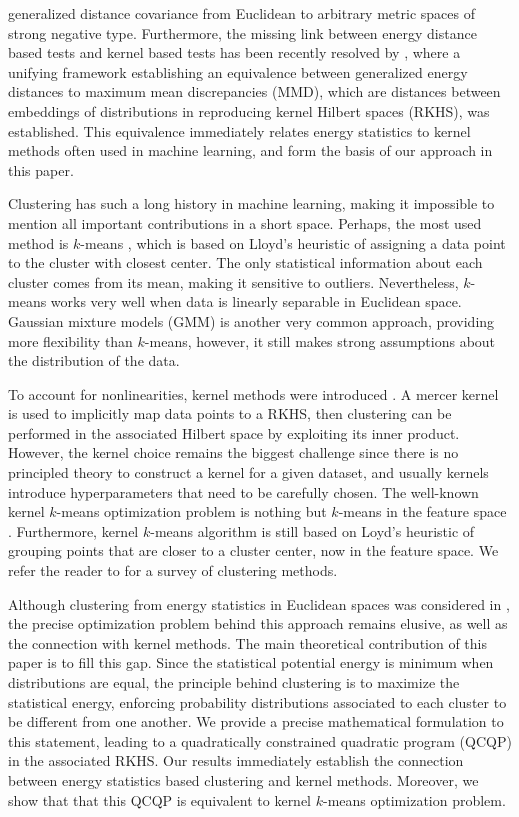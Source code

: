 \documentclass{article}
\begin{document}
\citet{Lyons} generalized
distance covariance from Euclidean 
to arbitrary metric spaces of strong negative type. Furthermore, 
the missing link between energy distance based tests and kernel 
based tests has 
been recently resolved by \citet{Sejdinovic2013}, where a unifying framework
establishing an equivalence between generalized energy distances to maximum
mean discrepancies (MMD), which are distances between embeddings of 
distributions in reproducing kernel Hilbert spaces (RKHS), was established. 
This equivalence immediately relates energy statistics to
kernel methods often used in machine learning, and form the basis 
of our approach in this paper.

Clustering has such a long history in machine learning, making it
impossible to mention all important contributions in a short space. 
Perhaps, the most used method is $k$-means \citep{Lloyd,MacQueen,Forgy}, which
is based on Lloyd's heuristic \citep{Lloyd} of assigning a data point to
the cluster with closest center. The only statistical 
information about each cluster comes from its mean, making it sensitive 
to outliers. Nevertheless, $k$-means works very well when data is 
linearly separable in Euclidean space. Gaussian mixture models (GMM) is 
another very common approach, providing more flexibility than $k$-means, 
however, it still makes strong assumptions about the distribution of 
the data.

To account for nonlinearities, kernel methods were introduced 
\citep{Smola,Girolami}. A mercer kernel \citep{Mercer} is used to implicitly
map data points to a RKHS, then clustering can be performed in the associated
Hilbert space by exploiting its inner product. However, 
the kernel choice remains 
the biggest challenge since there is no principled theory to construct a kernel
for a given dataset, and usually kernels introduce hyperparameters that 
need to be carefully chosen.
The well-known kernel $k$-means optimization problem is nothing but $k$-means 
in the feature space \citep{Girolami}. Furthermore, kernel $k$-means algorithm
\citep{Dhillon2,Dhillon} is still based on Loyd's heuristic 
of grouping points that are closer to a cluster center, now
in the feature space. 
We refer the reader to \citet{Filippone} for a survey of clustering
methods.

Although clustering from energy statistics in Euclidean spaces was considered
in \citet{Kgroups}, the precise optimization problem behind this approach
remains elusive, as well as the connection with kernel methods.
The main theoretical contribution of this paper is to fill this gap.
Since the statistical potential energy is minimum when
distributions are equal, the principle behind clustering is to maximize 
the statistical energy,  enforcing probability distributions associated to 
each cluster to be different from one another. We provide a precise 
mathematical formulation to this statement, leading to a quadratically 
constrained quadratic program (QCQP) in the associated RKHS. Our results
immediately establish the connection between energy statistics based
clustering and kernel methods. Moreover, we show that that this 
QCQP is equivalent to kernel $k$-means optimization problem. 
\end{document}
